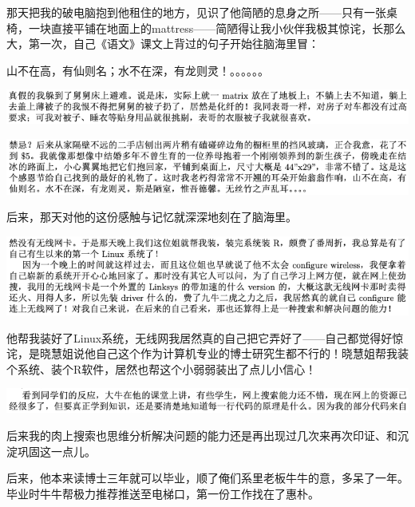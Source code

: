 \documentclass[9pt, b5paper]{article}
\begin{document}
那天把我的破电脑抱到他租住的地方，见识了他简陋的息身之所——只有一张桌椅，一块直接平铺在地面上的mattress——简陋得让我小伙伴我极其惊诧，长那么大，第一次，自己《语文》课文上背过的句子开始往脑海里冒：

山不在高，有仙则名；水不在深，有龙则灵！。。。。。。

\begin{center}
\includegraphics[width=.9\linewidth]{./pic/backups_plans_20210422_092547.png}
\end{center}

\begin{center}
\includegraphics[width=.9\linewidth]{./pic/backups_plans_20210422_092432.png}
\end{center}

后来，那天对他的这份感触与记忆就深深地刻在了脑海里。 

\begin{center}
\includegraphics[width=.9\linewidth]{./pic/backups_plans_20210425_104206.png}
\end{center}

他帮我装好了Linux系统，无线网我居然真的自己把它弄好了——自己都觉得好惊诧，是晓慧姐说他自己这个作为计算机专业的博士研究生都不行的！晓慧姐帮我装个系统、装个R软件，居然也帮这个小弱弱装出了点儿小信心！

\begin{center}
\includegraphics[width=.9\linewidth]{./pic/backups_plans_20210425_110440.png}
\end{center}

后来我的肉上搜索也思维分析解决问题的能力还是再出现过几次来再次印证、和沉淀巩固这一点儿。 

后来，他本来读博士三年就可以毕业，顺了俺们系里老板牛牛的意，多呆了一年。毕业时牛牛帮极力推荐推送至电梯口，第一份工作找在了惠朴。
\end{document}
